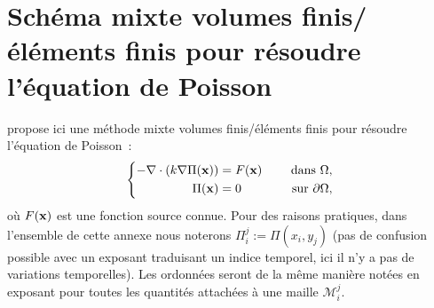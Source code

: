 \documentclass[main.tex]{subfiles}
\begin{document}
\chapter{\label{chap:anx_methode_mixte_VFEF}Schéma mixte volumes finis/éléments finis pour résoudre l'équation de Poisson}

\allowdisplaybreaks[1]
 propose ici une méthode mixte volumes finis/éléments finis pour résoudre l'équation de Poisson~:
\begin{equation}\label{eq:anx_poisson}
\left\{
\begin{aligned}
-\nabla\cdot ( k \nabla \Pi(\mathbf{x}) ) &= F(\mathbf{x}) & \quad \textrm{ dans }  \Omega , \\
\Pi(\mathbf{x}) &=0 & \quad \textrm{ sur  } \partial \Omega,
\end{aligned}
\right.
\end{equation}
où $F(\mathbf{x})$ est une fonction source connue. Pour des raisons pratiques, dans l'ensemble de cette annexe nous noterons $\Pi_i^j := \Pi(x_i,y_j)$ (pas de confusion possible avec un exposant traduisant un indice temporel, ici il n'y a pas de variations temporelles). Les ordonnées seront de la même manière notées en exposant pour toutes les quantités attachées à une maille $\mathcal{M}_i^j$.
\end{document}
